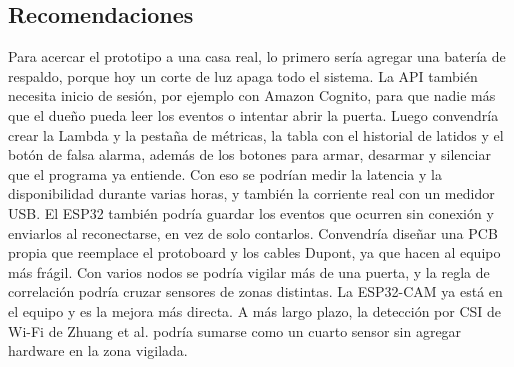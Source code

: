 \documentclass[manuscript,screen,nonacm]{acmart}
\begin{document}
\subsection{Recomendaciones}
Para acercar el prototipo a una casa real, lo primero sería agregar una batería de respaldo, porque hoy un corte de luz apaga todo el sistema. La API también necesita inicio de sesión, por ejemplo con Amazon Cognito, para que nadie más que el dueño pueda leer los eventos o intentar abrir la puerta. Luego convendría crear la Lambda y la pestaña de métricas, la tabla con el historial de latidos y el botón de falsa alarma, además de los botones para armar, desarmar y silenciar que el programa ya entiende. Con eso se podrían medir la latencia y la disponibilidad durante varias horas, y también la corriente real con un medidor USB. El ESP32 también podría guardar los eventos que ocurren sin conexión y enviarlos al reconectarse, en vez de solo contarlos. Convendría diseñar una PCB propia que reemplace el protoboard y los cables Dupont, ya que hacen al equipo más frágil. Con varios nodos se podría vigilar más de una puerta, y la regla de correlación podría cruzar sensores de zonas distintas. La ESP32-CAM ya está en el equipo y es la mejora más directa. A más largo plazo, la detección por CSI de Wi-Fi de Zhuang et al. \cite{zhuang2021intrusion} podría sumarse como un cuarto sensor sin agregar hardware en la zona vigilada.
\end{document}
